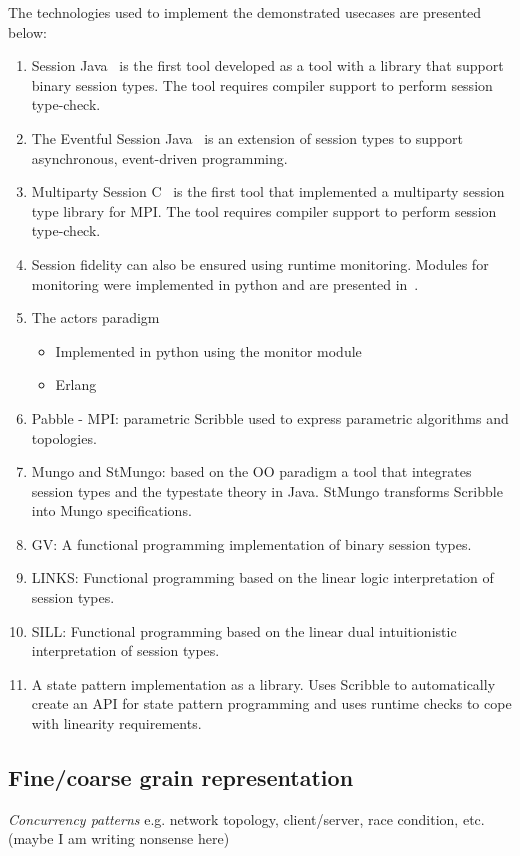 The technologies used to implement the demonstrated usecases are presented
below:
%
\begin{enumerate}
	\item	Session Java~\cite{HU07TYPE-SAFE} is the first tool
			developed as a tool with a library that support binary session
			types. The tool requires compiler support to perform session
			type-check.

	\item	The Eventful Session Java~\cite{event} is an extension
			of session types to support asynchronous, event-driven programming.

	\item	Multiparty Session C~\cite{NYH12}
			is the first tool that implemented a
			multiparty session type library for MPI.
			The tool requires compiler support to perform session
			type-check.


	\item	Session fidelity can also be ensured using runtime monitoring.
			Modules for monitoring were implemented in python and are presented in~\cite{DBLP:conf/rv/NeykovaYH13}.

	\item	The actors paradigm
			\begin{itemize}
				\item	Implemented in python using the monitor module
				\item	Erlang
			\end{itemize}
	\item	Pabble - MPI: parametric Scribble used to express parametric algorithms and topologies.
	\item	Mungo and StMungo:	based on the OO paradigm a tool that integrates session types and the 
								typestate theory in Java. StMungo transforms Scribble into Mungo
								specifications.
	\item	GV:			A functional programming implementation of binary session types.
	\item	LINKS:		Functional programming based on the linear logic interpretation of session types.
	\item	SILL:		Functional programming based on the linear dual intuitionistic interpretation of session types.

	\item	A state pattern implementation as a library. Uses Scribble to automatically
			create an API for state pattern programming and uses runtime checks to
			cope with linearity requirements.

\end{enumerate}

\subsection{Fine/coarse grain representation}

{\em Concurrency patterns} e.g. network topology, client/server, race condition, etc. (maybe I am writing nonsense here)

